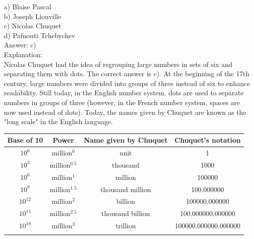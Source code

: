 \documentclass[letterpaper, 12pt]{article}
\begin{document}
a) Blaise Pascal\\
b) Joseph Liouville\\
c) Nicolas Chuquet\\
d) Pafnouti Tchebychev\\

Answer: c)\\

Explanation:\\
Nicolas Chuquet had the idea of regrouping large numbers in sets of six and separating them with dots. The correct answer is c). At the beginning of the 17th century, large numbers were divided into groups of three instead of six to enhance readability. Still today, in the English number system, dots are used to separate numbers in groups of three (however, in the French number system, spaces are now used instead of dots). Today, the names given by Chuquet are known as the "long scale" in the English language. \\
\begin{center}
\begin{tabular}{|c|c|c|c|} \hline
{\bf Base of 10} & {\bf Power} & {\bf Name given by Chuquet} & {\bf Chuquet's notation} \\ \hline \hline
$10^{0}$ & million$^{0}$ & unit & 1\\[1mm] \hline
$10^{3}$ & million$^{0.5}$ & thousand & 1000\\[1mm] \hline
$10^{6}$ & million$^{1}$ & million & 100000\\[1mm] \hline
$10^{9}$ & million$^{1.5}$ & thousand million & 100.000000\\[1mm] \hline
$10^{12}$ & million$^{2}$ & billion & 100000.000000\\[1mm] \hline
$10^{15}$ & million$^{2.5}$ & thousand billion & 100.000000.000000\\[1mm] \hline
$10^{18}$ & million$^{3}$ & trillion & 100000.000000.000000\\[1mm] \hline
\multicolumn{4}{c}{}\\
\end{tabular}\\
\end{center}
\end{document}
